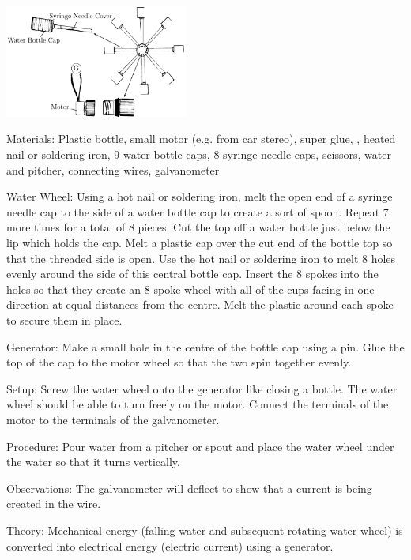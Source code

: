 \begin{multicols}{2}
\begin{center}
\includegraphics[width=0.45\textwidth]{./img/water-turbine.png}
\end{center}

\begin{description*}
\item[Materials:]{Plastic bottle, small motor (e.g. from car stereo), super glue, , heated nail or soldering iron, 9 water bottle caps, 8 syringe needle caps, scissors, water and pitcher, connecting wires, galvanometer}
\item[Water Wheel:]{Using a hot nail or soldering iron, melt the open end of a syringe needle cap to the side of a water bottle cap to create a sort of spoon. Repeat 7 more times for a total of 8 pieces. Cut the top off a water bottle just below the lip which holds the cap. Melt a plastic cap over the cut end of the bottle top so that the threaded side is open. Use the hot nail or soldering iron to melt 8 holes evenly around the side of this central bottle cap. Insert the 8 spokes into the holes so that they create an 8-spoke wheel with all of the cups facing in one direction at equal distances from the centre. Melt the plastic around each spoke to secure them in place.}
\item[Generator:]{Make a small hole in the centre of the bottle cap using a pin. Glue the top of the cap to the motor wheel so that the two spin together evenly.}
\item[Setup:]{Screw the water wheel onto the generator like closing a bottle. The water wheel should be able to turn freely on the motor. Connect the terminals of the motor to the terminals of the galvanometer.}
\item[Procedure:]{Pour water from a pitcher or spout and place the water wheel under the water so that it turns vertically.}
\item[Observations:]{The galvanometer will deflect to show that a current is being created in the wire.}
\item[Theory:]{Mechanical energy (falling water and subsequent rotating water wheel) is converted into electrical energy (electric current) using a generator.}
\end{description*}


\end{multicols}
